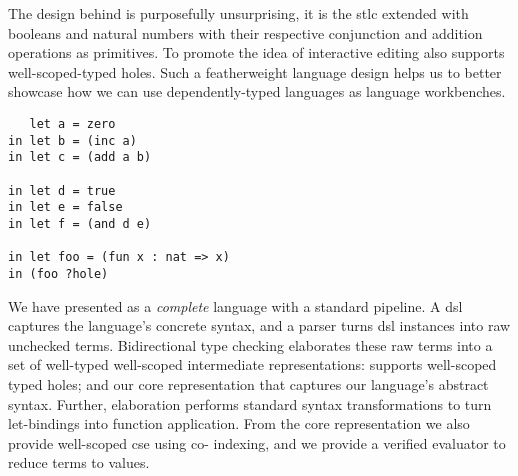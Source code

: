 

The design behind \Velo{} is purposefully unsurprising, it is the \ac{stlc} extended with booleans and natural numbers with their respective conjunction and addition operations as primitives.
To promote the idea of interactive editing \Velo{} also supports well-scoped-typed holes.
Such a featherweight language design helps us to better showcase how we can use dependently-typed languages as language workbenches.

\begin{Verbatim}
   let a = zero
in let b = (inc a)
in let c = (add a b)

in let d = true
in let e = false
in let f = (and d e)

in let foo = (fun x : nat => x)
in (foo ?hole)

\end{Verbatim}

We have presented \Velo{} as a \emph{complete} language with a standard pipeline.
A \ac{dsl} captures the language's concrete syntax, and a parser turns \ac{dsl} instances into raw unchecked terms.
Bidirectional type checking elaborates these raw terms into a set of well-typed well-scoped intermediate representations:  supports well-scoped typed holes; and  our core representation that captures our language's abstract syntax.
Further, elaboration performs standard syntax transformations to turn let-bindings into function application.
From the core representation we also provide well-scoped \ac{cse} using co-\DeBruijn{} indexing, and we provide a verified evaluator to reduce terms to values.



